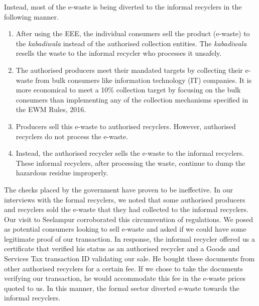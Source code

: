 \documentclass[a4paper, 12pt]{article}
\begin{document}
                    Instead, most of the e-waste is being diverted to the informal recyclers in the following manner.                    
                    \begin{enumerate}
                      \item After using the EEE, the individual consumers sell the product (e-waste) to the \textit{kabadiwala} instead of the authorised collection entities. The \textit{kabadiwala} resells the waste to the informal recycler who processes it unsafely. 
                      \item The authorised producers meet their mandated targets by collecting their e-waste from bulk consumers like information technology (IT) companies. It is more economical to meet a 10\% collection target by focusing on the bulk consumers than implementing any of the collection mechanisms specified in the EWM Rules, 2016.
                      \item Producers sell this e-waste to authorised recyclers. However, authorised recyclers do not process the e-waste.  
                      \item Instead, the authorised recycler sells the e-waste to the informal recyclers. These informal recyclers, after processing the waste, continue to dump the hazardous residue improperly.
                    \end{enumerate}
                    
                    The checks placed by the government have proven to be ineffective. In our interviews with the formal recyclers, we noted that some authorised producers and recyclers sold the e-waste that they had collected to the informal recyclers. \\
                    
                    Our visit to Seelampur corroborated this circumvention of regulations. We posed as potential consumers looking to sell e-waste and asked if we could have some legitimate proof of our transaction. In response, the informal recycler offered us a certificate that verified his status as an authorised recycler and a Goods and Services Tax transaction ID validating our sale. He bought these documents from other authorised recyclers for a certain fee. If we chose to take the documents verifying our transaction, he would accommodate this fee in the e-waste prices quoted to us. In this manner, the formal sector diverted e-waste towards the informal recyclers. \\
                    
\end{document}
